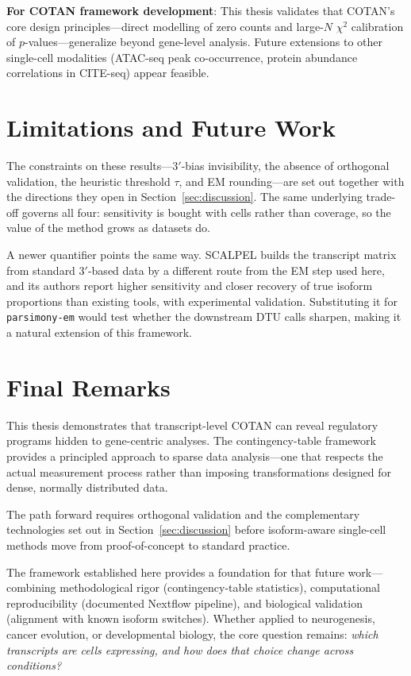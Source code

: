 \textbf{For COTAN framework development}: This thesis validates that COTAN's core design principles---direct modelling of zero counts and large-$N$ $\chi^2$ calibration of $p$-values---generalize beyond gene-level analysis. Future extensions to other single-cell modalities (ATAC-seq peak co-occurrence, protein abundance correlations in CITE-seq) appear feasible.

\section{Limitations and Future Work}

The constraints on these results---$3'$-bias invisibility, the absence of orthogonal validation, the heuristic threshold $\tau$, and EM rounding---are set out together with the directions they open in Section~\ref{sec:discussion}. The same underlying trade-off governs all four: sensitivity is bought with cells rather than coverage, so the value of the method grows as datasets do.

A newer quantifier points the same way. SCALPEL\cite{ake2025scalpel} builds the transcript matrix from standard $3'$-based data by a different route from the EM step used here, and its authors report higher sensitivity and closer recovery of true isoform proportions than existing tools, with experimental validation. Substituting it for \texttt{parsimony-em} would test whether the downstream DTU calls sharpen, making it a natural extension of this framework.

\section*{Final Remarks}

This thesis demonstrates that transcript-level COTAN can reveal regulatory programs hidden to gene-centric analyses. The contingency-table framework provides a principled approach to sparse data analysis---one that respects the actual measurement process rather than imposing transformations designed for dense, normally distributed data.

The path forward requires orthogonal validation and the complementary technologies set out in Section~\ref{sec:discussion} before isoform-aware single-cell methods move from proof-of-concept to standard practice.

The framework established here provides a foundation for that future work---combining methodological rigor (contingency-table statistics), computational reproducibility (documented Nextflow pipeline), and biological validation (alignment with known isoform switches). Whether applied to neurogenesis, cancer evolution, or developmental biology, the core question remains: \textit{which transcripts are cells expressing, and how does that choice change across conditions?}